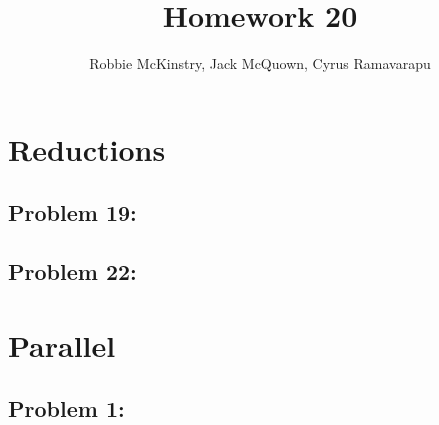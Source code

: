 \documentclass[12pt]{article}
\begin{document}
\title{Homework 20}
\author{Robbie McKinstry, Jack McQuown, Cyrus Ramavarapu}
\renewcommand{\today}{18 September 2016}
\renewcommand{\baselinestretch}{1.5}
\maketitle

\section*{Reductions}
\subsection*{Problem 19: }
\subsection*{Problem 22: }

\section*{Parallel}
\subsection*{Problem 1: }
\end{document}
